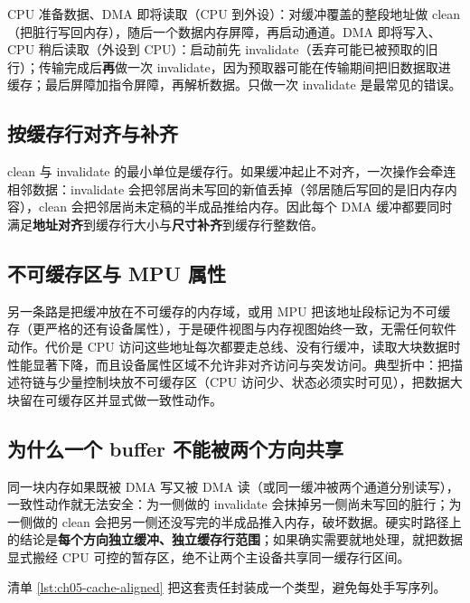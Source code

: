 \documentclass[12pt,a4paper,fontset=fandol]{ctexbook}
\begin{document}
\begin{guideline}[title={一致性动作顺序：设备读前 clean，设备写前 invalidate，CPU 读后再次 invalidate}]
CPU 准备数据、DMA 即将读取（CPU 到外设）：对缓冲覆盖的整段地址做 clean（把脏行写回内存），随后一个数据内存屏障，再启动通道。DMA 即将写入、CPU 稍后读取（外设到 CPU）：启动前先 invalidate（丢弃可能已被预取的旧行）；传输完成后\textbf{再}做一次 invalidate，因为预取器可能在传输期间把旧数据取进缓存；最后屏障加指令屏障，再解析数据。只做一次 invalidate 是最常见的错误。
\end{guideline}

\subsection{按缓存行对齐与补齐}

clean 与 invalidate 的最小单位是缓存行。如果缓冲起止不对齐，一次操作会牵连相邻数据：invalidate 会把邻居尚未写回的新值丢掉（邻居随后写回的是旧内存内容），clean 会把邻居尚未定稿的半成品推给内存。因此每个 DMA 缓冲都要同时满足\textbf{地址对齐}到缓存行大小与\textbf{尺寸补齐}到缓存行整数倍。

\subsection{不可缓存区与 MPU 属性}

另一条路是把缓冲放在不可缓存的内存域，或用 MPU 把该地址段标记为不可缓存（更严格的还有设备属性），于是硬件视图与内存视图始终一致，无需任何软件动作。代价是 CPU 访问这些地址每次都要走总线、没有行缓冲，读取大块数据时性能显著下降，而且设备属性区域不允许非对齐访问与突发访问。典型折中：把描述符链与少量控制块放不可缓存区（CPU 访问少、状态必须实时可见），把数据大块留在可缓存区并显式做一致性动作。

\subsection{为什么一个 buffer 不能被两个方向共享}

同一块内存如果既被 DMA 写又被 DMA 读（或同一缓冲被两个通道分别读写），一致性动作就无法安全：为一侧做的 invalidate 会抹掉另一侧尚未写回的脏行；为一侧做的 clean 会把另一侧还没写完的半成品推入内存，破坏数据。硬实时路径上的结论是\textbf{每个方向独立缓冲、独立缓存行范围}；如果确实需要就地处理，就把数据显式搬经 CPU 可控的暂存区，绝不让两个主设备共享同一缓存行区间。

清单 \ref{lst:ch05-cache-aligned} 把这套责任封装成一个类型，避免每处手写序列。
\end{document}
